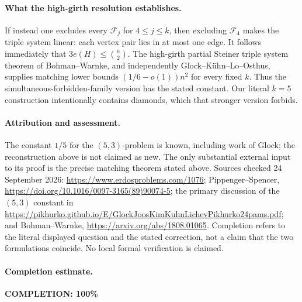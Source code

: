 \paragraph{What the high-girth resolution establishes.}
If instead one excludes every \(\mathcal F_j\) for \(4\leq j\leq k\), then excluding \(\mathcal F_4\) makes the triple system linear: each vertex pair lies in at most one edge. It follows immediately that \(3e(H)\leq\binom n2\). The high-girth partial Steiner triple system theorem of Bohman--Warnke, and independently Glock--K\"uhn--Lo--Osthus, supplies matching lower bounds \((1/6-o(1))n^2\) for every fixed \(k\). Thus the simultaneous-forbidden-family version has the stated constant. Our literal \(k=5\) construction intentionally contains diamonds, which that stronger version forbids.

\paragraph{Attribution and assessment.}
The constant \(1/5\) for the \((5,3)\)-problem is known, including work of Glock; the reconstruction above is not claimed as new. The only substantial external input to its proof is the precise matching theorem stated above. Sources checked 24 September 2026: \url{https://www.erdosproblems.com/1076}; Pippenger--Spencer, \url{https://doi.org/10.1016/0097-3165(89)90074-5}; the primary discussion of the \((5,3)\) constant in \url{https://pikhurko.github.io/E/GlockJoosKimKuhnLichevPikhurko24pams.pdf}; and Bohman--Warnke, \url{https://arxiv.org/abs/1808.01065}. Completion refers to the literal displayed question and the stated correction, not a claim that the two formulations coincide. No local formal verification is claimed.

\paragraph{Completion estimate.}
\textbf{COMPLETION: 100\%}
